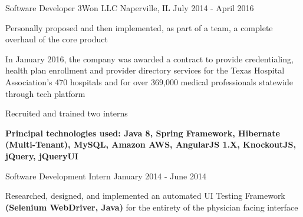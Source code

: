 \begin{cventries}
  \cventry
    {Software Developer} %
    {3Won LLC} %
    {Naperville, IL} %
    {July 2014 - April 2016} %
    {
      \begin{cvitems} %
         \item{Personally proposed and then implemented, as part of a team, a complete overhaul of the core product}
  \item{In January 2016, the company was awarded a contract to provide credentialing, health plan enrollment and provider directory services for the Texas Hospital Association’s 470 hospitals and for over 369,000 medical professionals statewide through tech platform}
 \item{Recruited and trained two interns}
 \item{\textbf{Principal technologies used: Java 8, Spring Framework, Hibernate (Multi-Tenant), MySQL, Amazon AWS, AngularJS 1.X, KnockoutJS, jQuery, jQueryUI}}
      \end{cvitems}
    }

  \cventry
    {Software Development Intern} %
    {} %
    {} %
    {January 2014 - June 2014} %
    {
      \begin{cvitems} %
         \item{Researched, designed, and implemented an automated UI Testing Framework \textbf{(Selenium WebDriver, Java)} for the entirety of the physician facing interface}
      \end{cvitems}
    }

\end{cventries}
